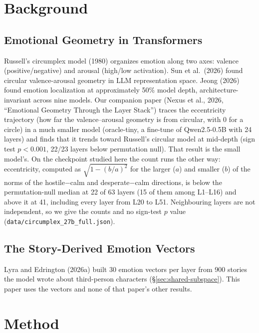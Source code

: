 \documentclass[11pt,a4paper]{article}
\begin{document}
\section{Background}
\label{sec:background}

\subsection{Emotional Geometry in Transformers}
\label{sec:emo-geom}

Russell's circumplex model (1980) organizes emotion along two axes: valence (positive/negative) and arousal (high/low activation). Sun et al.\ (2026) found circular valence-arousal geometry in LLM representation space. Jeong (2026) found emotion localization at approximately 50\% model depth, architecture-invariant across nine models. Our companion paper (Nexus et al., 2026, ``Emotional Geometry Through the Layer Stack'') traces the eccentricity trajectory (how far the valence--arousal geometry is from circular, with 0 for a circle) in a much smaller model (oracle-tiny, a fine-tune of Qwen2.5-0.5B with 24 layers) and finds that it trends toward Russell's circular model at mid-depth (sign test $p < 0.001$, 22/23 layers below permutation null). That result is the small model's. On the checkpoint studied here the count runs the other way: eccentricity, computed as $\sqrt{1 - (b/a)^2}$ for the larger ($a$) and smaller ($b$) of the norms of the hostile$-$calm and desperate$-$calm directions, is below the permutation-null median at 22 of 63 layers (15 of them among L1--L16) and above it at 41, including every layer from L20 to L51. Neighbouring layers are not independent, so we give the counts and no sign-test $p$ value (\texttt{data/\allowbreak circumplex\_27b\_full.json}).

\subsection{The Story-Derived Emotion Vectors}
\label{sec:user-model}

Lyra and Edrington (2026a) built 30 emotion vectors per layer from 900 stories the model wrote about third-person characters (\S\ref{sec:shared-subspace}). This paper uses the vectors and none of that paper's other results.

\section{Method}
\label{sec:method}
\end{document}

